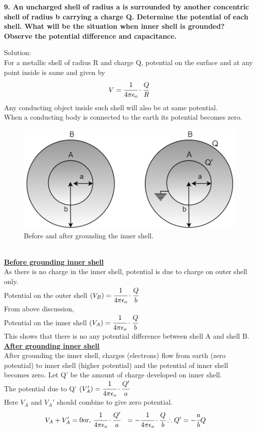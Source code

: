\newpage
\begin{tcolorbox}
\textbf{9. An uncharged shell of radius a is surrounded by another concentric shell of radius b carrying a charge Q. Determine the potential of each shell. What will be the situation when inner shell is grounded? Observe the potential difference and capacitance.}
\end{tcolorbox}
Solution:\\
For a metallic shell of radius R and charge Q, potential on the surface and at any point inside is same and given by \[ V = \cfrac{1}{4 \pi \epsilon_o}\cdot \cfrac{Q}{R}\]
Any conducting object inside such shell will also be at same potential.\\
When a conducting body is connected to the earth its potential becomes zero.
\begin{figure}[h]
    \centering
    \includegraphics[scale = 0.6]{figures/Sandesh's Figures/bag.png}
    \caption{Before and after grounding the inner shell.}
    \label{bag}
\end{figure}
\\
\textbf{\underline{Before grounding inner shell}}
\vspace{3pt}
\\
As there is no charge in the inner shell, potential is due to charge on outer shell only. \\
Potential on the outer shell $(V_B) = \cfrac{1}{4 \pi \epsilon_o}\cdot \cfrac{Q}{b}$\\
From above discussion,\\
Potential on the inner shell $(V_A) = \cfrac{1}{4 \pi \epsilon_o}\cdot \cfrac{Q}{b}$
\vspace{3pt}
\\
This shows that there is no any potential difference between shell A and shell B.\\
 \textbf{\underline{After grounding inner shell}}
\vspace{3pt}
\\
After grounding the inner shell, charges (electrons) flow from earth (zero potential) to inner shell (higher potential) and the potential of inner shell becomes zero. Let Q' be the amount of charge developed on inner shell. \\
The potential due to Q' $(V_A') =  \cfrac{1}{4 \pi \epsilon_o}\cdot \cfrac{Q'}{a}$\\
Here $V_A$ and $V_A'$ should combine to give zero potential.
\begin{align*}
   V_A + V_A' &= 0
    \text{or, } \cfrac{1}{4 \pi \epsilon_o}\cdot \cfrac{Q'}{a} &= - \cfrac{1}{4 \pi \epsilon_o}\cdot \cfrac{Q}{b} 
   \therefore Q' &= -\cfrac{a}{b} Q
\end{align*}

